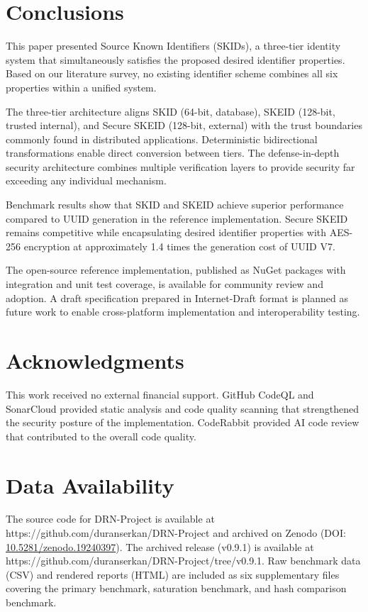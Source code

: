 \documentclass[fleqn,10pt,lineno]{wlpeerj}
\begin{document}
\section{Conclusions}\label{conclusions}

This paper presented Source Known Identifiers (SKIDs), a three-tier
identity system that simultaneously satisfies the proposed desired
identifier properties. Based on our literature survey, no existing
identifier scheme combines all six properties within a unified system.

The three-tier architecture aligns SKID (64-bit, database), SKEID
(128-bit, trusted internal), and Secure SKEID (128-bit, external) with
the trust boundaries commonly found in distributed applications.
Deterministic bidirectional transformations enable direct conversion
between tiers. The defense-in-depth security architecture combines
multiple verification layers to provide security far exceeding any
individual mechanism.

Benchmark results show that SKID and SKEID achieve superior performance
compared to UUID generation in the reference implementation. Secure
SKEID remains competitive while encapsulating desired identifier
properties with AES-256 encryption at approximately 1.4 times the
generation cost of UUID V7.

The open-source reference implementation, published as NuGet packages
with integration and unit test coverage, is available for community
review and adoption. A draft specification prepared in Internet-Draft
format is planned as future work to enable cross-platform implementation
and interoperability testing.

\section{Acknowledgments}\label{acknowledgments}

This work received no external financial support. GitHub CodeQL and
SonarCloud provided static analysis and code quality scanning that
strengthened the security posture of the implementation. CodeRabbit
provided AI code review that contributed to the overall code quality.

\section{Data Availability}\label{data-availability}

The source code for DRN-Project is available at
https://github.com/duranserkan/DRN-Project and archived on Zenodo (DOI:
\href{https://doi.org/10.5281/zenodo.19240397}{10.5281/zenodo.19240397}).
The archived release (v0.9.1) is available at
https://github.com/duranserkan/DRN-Project/tree/v0.9.1. Raw benchmark
data (CSV) and rendered reports (HTML) are included as six supplementary
files covering the primary benchmark, saturation benchmark, and hash
comparison benchmark.
\end{document}
